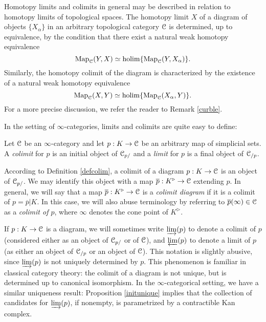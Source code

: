 \begin{Didn't Read}
\begin{remark}
Homotopy limits and colimits in general may be described in
relation to homotopy limits of topological spaces. The homotopy
limit $X$ of a diagram of objects $\{X_{\alpha} \}$ in an
arbitrary topological category $\operatorname{\mathcal{C}}$ is determined, up to
equivalence, by the condition that there exist a natural weak homotopy
equivalence
$$\operatorname{{Map}}_{\operatorname{\mathcal{C}}}(Y,X) \simeq \operatorname{holim} \{ \operatorname{{Map}}_{\operatorname{\mathcal{C}}}(Y, X_{\alpha})
\}.$$ Similarly, the homotopy colimit of the diagram is characterized by
the existence of a natural weak homotopy equivalence
$$\operatorname{{Map}}_{\operatorname{\mathcal{C}}}(X,Y) \simeq \operatorname{holim} \{ \operatorname{{Map}}_{\operatorname{\mathcal{C}}}(X_{\alpha},Y)
\}.$$
For a more precise discussion, we refer the reader to Remark \ref{curble}.
\end{remark}

In the setting of $\infty$-categories, limits and colimits
are quite easy to define:

\begin{definition}\label{defcolim}
Let $\operatorname{\mathcal{C}}$ be an $\infty$-category and let $p: K \rightarrow \operatorname{\mathcal{C}}$ be an
arbitrary map of simplicial sets. A {\it colimit} for $p$ is
an initial object of $\operatorname{\mathcal{C}}_{p/}$ and a {\it limit} for $p$ is a final
object of $\operatorname{\mathcal{C}}_{/p}$.
\end{definition}

\begin{remark}
According to Definition \ref{defcolim}, a colimit of a diagram $p: K \rightarrow \operatorname{\mathcal{C}}$
is an object of $\operatorname{\mathcal{C}}_{p/}$. We may identify this object with a map
$\overline{p}: K^{\triangleright} \rightarrow \operatorname{\mathcal{C}}$ extending $p$. In general, we will say that a map $\overline{p}: K^{\triangleright} \rightarrow \operatorname{\mathcal{C}}$ is a {\it colimit diagram} if it is a colimit
of $p = \overline{p} | K$. In this case, we will also abuse terminology by referring to
$\overline{p}(\infty) \in \operatorname{\mathcal{C}}$ as a {\it colimit of $p$}, where $\infty$ denotes the cone point of
$K^{\triangleright}$.
\end{remark}

If $p: K \rightarrow \operatorname{\mathcal{C}}$ is a diagram, we will sometimes
write $\varinjlim(p)$ to denote a colimit of $p$ (considered either as an object of
$\operatorname{\mathcal{C}}_{p/}$ or of $\operatorname{\mathcal{C}}$), and $\varprojlim(p)$ to denote a limit of $p$ (as either an object of
$\operatorname{\mathcal{C}}_{/p}$ or an object of $\operatorname{\mathcal{C}}$). This notation is slightly abusive, since $\varinjlim(p)$ is not uniquely determined by $p$. This phenomenon is familiar in classical category theory: the colimit of a diagram is not unique, but is determined up to canonical isomorphism. In the $\infty$-categorical setting, we have a similar uniqueness result: Proposition \ref{initunique} implies that the collection of candidates for $\varinjlim(p)$, if nonempty, is parametrized by a contractible Kan complex.


\end{Didn't Read}
